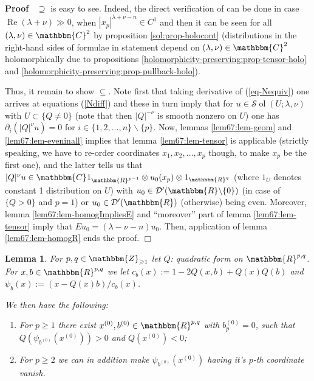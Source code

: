 \documentclass{article}
\newcommand{\assign}{:=}
\newcommand{\tmop}[1]{\ensuremath{\operatorname{#1}}}
\renewenvironment{proof}{\noindent\textbf{Proof\ }}{\hspace*{\fill}$\Box$\medskip}
\newtheorem{lemma}[proposition]{Lemma}
\theoremstyle{remark}
\begin{document}
\begin{proof}
  $\supseteq$ is easy to see. Indeed, the direct verification of can be done
  in case $\tmop{Re} (\lambda + \nu) \gg 0$, when $| x_p |^{\lambda + \nu - n}
  \in C^1$ and then it can be seen for all $(\lambda, \nu) \in \mathbbm{C}^2$
  by proposition \ref{sol:prop-holocont} (distributions in the right-hand
  sides of formulae in statement depend on $(\lambda, \nu) \in \mathbbm{C}^2$
  holomorphically due to propositions
  \ref{holomorphicity-preserving:prop-tensor-holo} and
  \ref{holomorphicity-preserving:prop-pullback-holo}).
  
  Thus, it remain to show $\subseteq$. Note first that taking derivative of
  (\ref{eq-Nequiv}) one arrives at equations (\ref{Ndiff}) and these in turn
  imply that for $u \in \mathcal{S} \tmop{ol} (U ; \lambda, \nu)$ with $U
  \subset \{ Q \neq 0 \}$ (note that then $| Q |^{- \nu}$ is smooth nonzero on
  $U$) one has $\partial_i (| Q |^{\nu} u) = 0$ for $i \in \{ 1, 2, \ldots, n
  \} \backslash \{ p \}$. Now, lemmas \ref{lem67:lem-geom} and
  \ref{lem67:lem-eveninall} implies that lemma \ref{lem67:lem-tensor} is
  applicable (strictly speaking, we have to re-order coordinates $x_1, x_2,
  \ldots, x_p$ though, to make $x_p$ be the first one), and the latter tells
  us that $| Q |^{\nu} u \in \mathbbm{C}1_{\mathbbm{R}^{p - 1}} \otimes u_0
  (x_p) \otimes 1_{\mathbbm{R}^q}$ (where $1_U$ denotes constant 1
  distribution on $U$) with $u_0 \in \mathcal{D}' (\mathbbm{R}\backslash \{ 0
  \})$ (in case of $\{ Q > 0 \}$ and $p = 1$) or $u_0 \in \mathcal{D}'
  (\mathbbm{R})$ (otherwise) being even. Moreover, lemma
  \ref{lem67:lem-homogImpliesE} and ``moreover'' part of lemma
  \ref{lem67:lem-tensor} imply that $E u_0 = (\lambda - \nu - n) u_0$. Then,
  application of lemma \ref{lem67:lem-homogR} ends the proof.
\end{proof}

\begin{lemma}
  \label{lem67:lem-flip}For $p, q \in \mathbbm{Z}_{\geqslant 1}$ let $Q$:
  quadratic form on $\mathbbm{R}^{p, q}$. For $x, b \in \mathbbm{R}^{p, q}$ we
  let $c_b (x) \assign 1 - 2 Q (x, b) + Q (x) Q (b)$ and $\psi_b (x) \assign
  (x - Q (x) b) / c_b (x)$.
  
  We then have the following:
  \begin{enumerate}
    \item For $p \geqslant 1$ there exist $x^{(0)}, b^{(0)} \in
    \mathbbm{R}^{p, q}$ with $b^{(0)}_p = 0$, such that $Q (\psi_{b^{(0)}}
    (x^{(0)})) > 0$ and $Q (x^{(0)}) < 0$;
    
    \item For $p \geqslant 2$ we can in addition make $\psi_{b^{(0)}}
    (x^{(0)})$ having it's $p$-th coordinate vanish.
  \end{enumerate}
\end{lemma}
\end{document}
